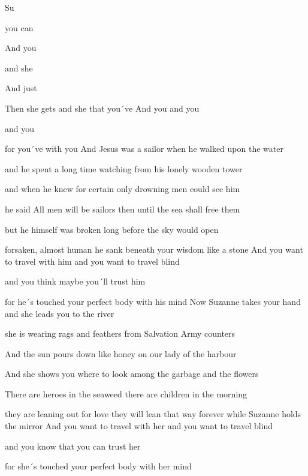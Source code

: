 
\zs
Su

you can 

And you 

and she  

And just  

Then she gets  and she  that you´ve 
\ks
\zr
And you  and you 

and you  

for you´ve  with you 
\kr
\zs
And Jesus was a sailor when he walked upon the water

and he spent a long time watching from his lonely wooden tower

and when he knew for certain only drowning men could see him

he said All men will be sailors then until the sea shall free them

but he himself was broken long before the sky would open

forsaken, almost human he sank beneath your wisdom like a stone
\ks
\zr
And you want to travel with him and you want to travel blind

and you think maybe you´ll trust him

for he´s touched your perfect body with his mind
\kr
\zs
Now Suzanne takes your hand and she leads you to the river

she is wearing rags and feathers from Salvation Army counters

And the sun pours down like honey on our lady of the harbour

And she shows you where to look among the garbage and the flowers

There are heroes in the seaweed there are children in the morning

they are leaning out for love they will lean that way forever while Suzanne holds the mirror
\ks
\zr
And you want to travel with her and you want to travel blind

and you know that you can trust her

for she´s touched your perfect body with her mind
\kr
\kp
